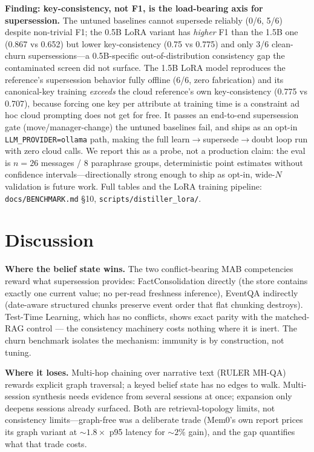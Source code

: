 \documentclass[11pt]{article}
\begin{document}
\textbf{Finding: key-consistency, not F1, is the load-bearing axis for supersession.} The
untuned baselines cannot supersede reliably (0/6, 5/6) despite non-trivial F1; the 0.5B LoRA
variant has \emph{higher} F1 than the 1.5B one (0.867 vs 0.652) but lower key-consistency
(0.75 vs 0.775) and only 3/6 clean-churn supersessions---a 0.5B-specific
out-of-distribution consistency gap the contaminated screen did not surface. The 1.5B LoRA
model reproduces the reference's supersession behavior fully offline (6/6, zero fabrication)
and its canonical-key training \emph{exceeds} the cloud reference's own key-consistency
(0.775 vs 0.707), because forcing one key per attribute at training time is a constraint ad
hoc cloud prompting does not get for free. It passes an end-to-end supersession gate
(move/manager-change) the untuned baselines fail, and ships as an opt-in
\texttt{LLM\_PROVIDER=ollama} path, making the full learn$\to$supersede$\to$doubt loop run
with zero cloud calls. We report this as a probe, not a production claim: the eval is
$n{=}26$ messages / 8 paraphrase groups, deterministic point estimates without confidence
intervals---directionally strong enough to ship as opt-in, wide-$N$ validation is future
work. Full tables and the LoRA training pipeline: \texttt{docs/BENCHMARK.md} \S10,
\texttt{scripts/distiller\_lora/}.

\section{Discussion}
\textbf{Where the belief state wins.} The two conflict-bearing MAB competencies reward
what supersession provides: FactConsolidation directly (the store contains exactly one
current value; no per-read freshness inference), EventQA indirectly (date-aware
structured chunks preserve event order that flat chunking destroys). Test-Time
Learning, which has no conflicts, shows exact parity with the matched-RAG control ---
the consistency machinery costs nothing where it is inert. The churn benchmark isolates
the mechanism: immunity is by construction, not tuning.

\textbf{Where it loses.} Multi-hop chaining over narrative text (RULER MH-QA) rewards
explicit graph traversal; a keyed belief state has no edges to walk. Multi-session
synthesis needs evidence from several sessions at once; expansion only deepens sessions
already surfaced. Both are retrieval-topology limits, not consistency limits---graph-free
was a deliberate trade (Mem0's own report prices its graph variant at ${\sim}1.8\times$ p95 latency for ${\sim}2\%$ gain),
and the gap quantifies what that trade costs.
\end{document}
